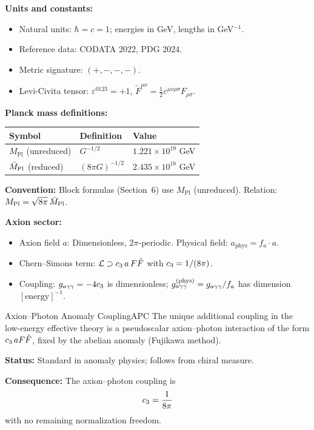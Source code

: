 \begin{tcolorbox}[colback=yellow!5, colframe=yellow!60!black, 
    title={\textbf{Conventions: Units, Masses, and Normalizations}}, fonttitle=\bfseries]

\textbf{Units and constants:}
\begin{itemize}[leftmargin=1.5em, topsep=2pt, itemsep=1pt]
    \item Natural units: $\hbar = c = 1$; energies in GeV, lengths in GeV$^{-1}$.
    \item Reference data: CODATA 2022, PDG 2024.
    \item Metric signature: $(+,-,-,-)$.
    \item Levi-Civita tensor: $\varepsilon^{0123} = +1$, $\tilde{F}^{\mu\nu} = \frac{1}{2}\varepsilon^{\mu\nu\rho\sigma}F_{\rho\sigma}$.
\end{itemize}

\textbf{Planck mass definitions:}
\begin{center}
\begin{tabular}{@{}lll@{}}
\toprule
\textbf{Symbol} & \textbf{Definition} & \textbf{Value}\\
\midrule
$M_{\mathrm{Pl}}$ (unreduced) & $G^{-1/2}$ & $1.221 \times 10^{19}$ GeV\\
$\bar{M}_{\mathrm{Pl}}$ (reduced) & $(8\pi G)^{-1/2}$ & $2.435 \times 10^{18}$ GeV\\
\bottomrule
\end{tabular}
\end{center}
\textbf{Convention:} Block formulas (Section~6) use $M_{\mathrm{Pl}}$ (unreduced). 
Relation: $M_{\mathrm{Pl}} = \sqrt{8\pi}\,\bar{M}_{\mathrm{Pl}}$.

\textbf{Axion sector:}
\begin{itemize}[leftmargin=1.5em, topsep=2pt, itemsep=1pt]
    \item Axion field $a$: Dimensionless, $2\pi$-periodic. Physical field: $a_{\text{phys}} = f_a \cdot a$.
    \item Chern--Simons term: $\mathcal{L} \supset c_3\, a\, F\tilde{F}$ with $c_3 = 1/(8\pi)$.
    \item Coupling: $g_{a\gamma\gamma} = -4c_3$ is dimensionless; $g_{a\gamma\gamma}^{\text{(phys)}} = g_{a\gamma\gamma} / f_a$ has dimension $[\text{energy}]^{-1}$.
\end{itemize}
\end{tcolorbox}

\begin{axiom}{Axion--Photon Anomaly Coupling}{APC}
The unique additional coupling in the low-energy effective theory is a 
pseudoscalar axion--photon interaction of the form $c_3\, a F\tilde{F}$, 
fixed by the abelian anomaly (Fujikawa method).

\tcblower
\textbf{Status:} Standard in anomaly physics; follows from chiral measure.

\textbf{Consequence:} The axion--photon coupling is
\begin{equation}
    c_3 = \frac{1}{8\pi}
\end{equation}
with no remaining normalization freedom.
\end{axiom}

